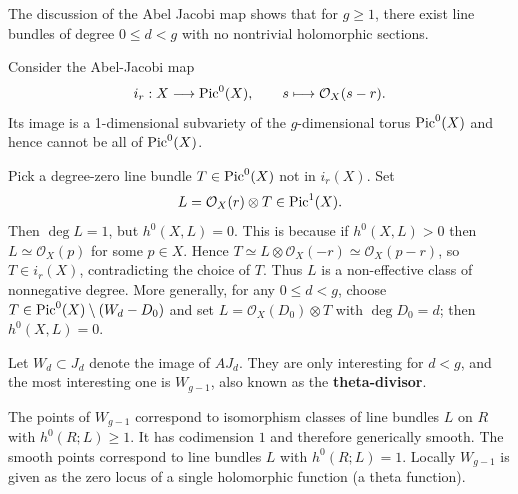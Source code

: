 \documentclass[12pt]{article}
\begin{document}
\begin{remark}\label{rmk:non-effective}

    The discussion of the Abel Jacobi map shows that for $g \geq 1$, there exist line bundles of degree $0 \leq d < g$ with no nontrivial holomorphic sections.

Consider the Abel-Jacobi map
\[
i_r:X\longrightarrow \operatorname{Pic}^0(X),\qquad s\longmapsto \mathcal{O}_X(s-r).
\]
Its image is a 1-dimensional subvariety of the $g$-dimensional torus $\operatorname{Pic}^0(X)$ and hence cannot be all of $\operatorname{Pic}^0(X)$.

Pick a degree-zero line bundle $T\in\operatorname{Pic}^0(X)$ not in $i_r(X)$.
Set
\[
L = \mathcal{O}_X(r)\otimes T \in \operatorname{Pic}^1(X).
\]
Then $\deg L=1$, but $h^0(X,L)=0$. This is because if $h^0(X,L)>0$ then $L\simeq \mathcal{O}_X(p)$ for some $p\in X$. Hence
$T \simeq L\otimes \mathcal{O}_X(-r) \simeq \mathcal{O}_X(p-r)$,
so $T\in i_r(X)$, contradicting the choice of $T$. Thus $L$ is a non-effective class of nonnegative degree.
More generally, for any $0\le d<g$, choose $T\in\operatorname{Pic}^0(X)\setminus (W_d - D_0)$ and set $L=\mathcal{O}_X(D_0)\otimes T$ with $\deg D_0=d$; then $h^0(X,L)=0$.
\end{remark}

Let $W_d \subset J_d$ denote the image of $AJ_d$.
They are only interesting for $d < g$,
and the most interesting one is $W_{g-1}$,
also known as the \textbf{theta-divisor}.

\begin{proposition}
    The points of $W_{g-1}$ correspond to
isomorphism classes of line bundles $L$ on $R$
with $h^0(R;L) \ge 1$. It has codimension $1$ and therefore generically smooth. The smooth points correspond to line bundles $L$ with $h^0(R;L) = 1$. Locally $W_{g-1}$ is given as the zero locus of a single holomorphic function (a theta function).
\end{proposition}
\end{document}

